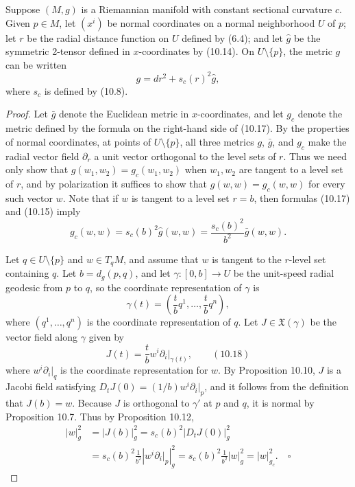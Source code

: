 \begin{theorem}\label{thm:constant-curvature-normal-coords}
Suppose $(M,g)$ is a Riemannian manifold with constant sectional curvature $c$. Given $p \in M$, let $(x^i)$ be normal coordinates on a normal neighborhood $U$ of $p$; let $r$ be the radial distance function on $U$ defined by (6.4); and let $\hat{g}$ be the symmetric 2-tensor defined in $x$-coordinates by (10.14). On $U \setminus \{p\}$, the metric $g$ can be written
\[
g = dr^2 + s_c(r)^2 \hat{g},
\]
where $s_c$ is defined by (10.8).

\begin{proof}
Let $\bar{g}$ denote the Euclidean metric in $x$-coordinates, and let $g_c$ denote the metric defined by the formula on the right-hand side of (10.17). By the properties of normal coordinates, at points of $U \setminus \{p\}$, all three metrics $g$, $\bar{g}$, and $g_c$ make the radial vector field $\partial_r$ a unit vector orthogonal to the level sets of $r$. Thus we need only show that $g(w_1, w_2) = g_c(w_1, w_2)$ when $w_1, w_2$ are tangent to a level set of $r$, and by polarization it suffices to show that $g(w,w) = g_c(w,w)$ for every such vector $w$. Note that if $w$ is tangent to a level set $r = b$, then formulas (10.17) and (10.15) imply
\[
g_c(w,w) = s_c(b)^2 \hat{g}(w,w) = \frac{s_c(b)^2}{b^2} \bar{g}(w,w).
\]

Let $q \in U \setminus \{p\}$ and $w \in T_q M$, and assume that $w$ is tangent to the $r$-level set containing $q$. Let $b = d_g(p,q)$, and let $\gamma : [0,b] \to U$ be the unit-speed radial geodesic from $p$ to $q$, so the coordinate representation of $\gamma$ is
\[
\gamma(t) = \left(\frac{t}{b}q^1, \ldots, \frac{t}{b}q^n\right),
\]
where $(q^1,\ldots,q^n)$ is the coordinate representation of $q$. Let $J \in \mathfrak{X}(\gamma)$ be the vector field along $\gamma$ given by
\[
J(t) = \frac{t}{b} w^i \partial_i |_{\gamma(t)}, \qquad (10.18)
\]
where $w^i \partial_i|_q$ is the coordinate representation for $w$. By Proposition 10.10, $J$ is a Jacobi field satisfying $D_t J(0) = (1/b) w^i \partial_i|_p$, and it follows from the definition that $J(b) = w$. Because $J$ is orthogonal to $\gamma'$ at $p$ and $q$, it is normal by Proposition 10.7. Thus by Proposition 10.12,
\begin{align*}
|w|_g^2 &= |J(b)|_g^2 = s_c(b)^2 |D_t J(0)|_g^2 \\
&= s_c(b)^2 \frac{1}{b^2} \left|w^i \partial_i |_p\right|_g^2 = s_c(b)^2 \frac{1}{b^2} |w|_g^2 = |w|_{g_c}^2. \quad \square
\end{align*}
\end{proof}
\end{theorem}

